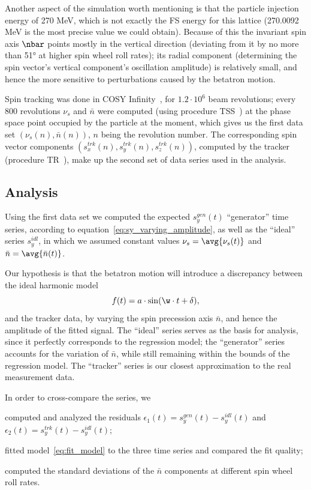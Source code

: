 Another aspect of the simulation worth mentioning is that the particle injection energy of 270 MeV, which is
not exactly the FS energy for this lattice (270.0092 MeV is the most precise value we could obtain).
Because of this the invariant spin axis $\nbar$ points mostly in the vertical direction (deviating from it
by no more than \ang{51} at higher spin wheel roll rates); its radial component (determining the 
spin vector's vertical component's oscillation amplitude) is relatively small, and hence the more sensitive
to perturbations caused by the betatron motion.

Spin tracking was done in COSY Infinity~\cite{COSYINF:Website}, for $1.2\cdot10^6$ beam revolutions;
every 800 revolutions $\nu_s$ and $\bar n$ were computed (using procedure
TSS~\cite[p.~41]{COSYINF:Manual:BeamPhys}) at the phase space point occupied by the particle at the moment,
which gives us the first data set $(\nu_s(n), \bar n(n))$, $n$ being the revolution number.
The corresponding spin vector components $(s_x^{trk}(n), s_y^{trk}(n), s_z^{trk}(n))$,
computed by the tracker (procedure TR~\cite[p.~41]{COSYINF:Manual:BeamPhys}), make up the second set of data
series used in the analysis.

\subsection{Analysis}
Using the first data set we computed the expected $s_y^{gen}(t)$ ``generator'' time series,
according to equation~\eqref{eq:sy_varying_amplitude}, as well as the ``ideal'' series $s_y^{idl}$,
in which we assumed constant values $\nu_s = \avg{\nu_s(t)}$ and $\bar n =\avg{\bar n(t)}$. 

Our hypothesis is that the betatron motion will introduce a discrepancy between the ideal
harmonic model
\begin{equation}
  f(t) = a\cdot\sin(\w\cdot t + \delta),\label{eq:fit_model}
\end{equation}
and the tracker data, by varying the spin precession axis $\bar n$, and hence
the amplitude of the fitted signal. The ``ideal'' series serves as the basis for analysis,
since it perfectly corresponds to the regression model; the ``generator'' series accounts for
the variation of $\bar n$, while still remaining within the bounds of the regression model.
The ``tracker'' series is our closest approximation to the real measurement data.

In order to cross-compare the series, we
\begin{enumerate*}
\item computed and analyzed the residuals $\epsilon_1(t) = s_y^{gen}(t) -  s_y^{idl}(t)$
  and $\epsilon_2(t) = s_y^{trk}(t) - s_y^{idl}(t)$;
\item fitted model~\eqref{eq:fit_model} to the three time series and
  compared the fit quality;
\item computed the standard deviations of the $\bar n$ components at different spin wheel roll rates.
\end{enumerate*}

